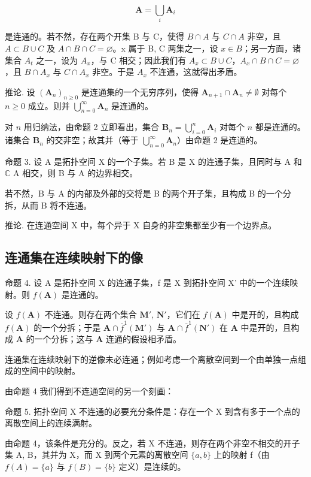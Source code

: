 \[
\mathbf {A} = \bigcup_ {i} \mathbf {A} _ {i}
\]

是连通的。若不然，存在两个开集 B 与 C，使得 \(B \cap A\) 与 \(C \cap A\) 非空，且 \(A \subset B \cup C\) 及 \(A \cap B \cap C = \varnothing\)。x 属于 B, C 两集之一，设 \(x \in B\)；另一方面，诸集合 \(A_t\) 之一，设为 \(A_x\)，与 C 相交；因此我们有 \(A_x \subset B \cup C\)，\(A_x \cap B \cap C = \varnothing\)，且 \(B \cap A_x\) 与 \(C \cap A_x\) 非空。于是 \(A_x\) 不连通，这就得出矛盾。

推论. 设 \((\mathbf{A}_n)_{n\geqslant 0}\) 是连通集的一个无穷序列，使得 \(\mathbf{A}_{n + 1}\cap \mathbf{A}_n\neq \emptyset\) 对每个 \(n\geqslant 0\) 成立。则并 \(\bigcup_{n = 0}^{\infty}\mathbf{A}_n\) 是连通的。

对 \(n\) 用归纳法，由命题 2 立即看出，集合 \(\mathbf{B}_n = \bigcup_{i=0}^n \mathbf{A}_i\) 对每个 \(n\) 都是连通的。诸集合 \(\mathbf{B}_n\) 的交非空；故其并（等于 \(\bigcup_{n=0}^{\infty} \mathbf{A}_n\)）由命题 2 是连通的。

命题 3. 设 A 是拓扑空间 X 的一个子集。若 B 是 X 的连通子集，且同时与 A 和 \(\mathbb{C}\) A 相交，则 B 与 A 的边界相交。

若不然，B 与 A 的内部及外部的交将是 B 的两个开子集，且构成 B 的一个分拆，从而 B 将不连通。

推论. 在连通空间 X 中，每个异于 X 自身的非空集都至少有一个边界点。

\subsection{连通集在连续映射下的像}

命题 4. 设 A 是拓扑空间 X 的连通子集，f 是 X 到拓扑空间 X' 中的一个连续映射。则 \(f(\mathbf{A})\) 是连通的。

设 \(f(\mathbf{A})\) 不连通。则存在两个集合 \(\mathbf{M}'\), \(\mathbf{N}'\)，它们在 \(f(\mathbf{A})\) 中是开的，且构成 \(f(\mathbf{A})\) 的一个分拆；于是 \(\mathbf{A} \cap \overline{f}^{1}(\mathbf{M}')\) 与 \(\mathbf{A} \cap \overline{f}^{1}(\mathbf{N}')\) 在 \(\mathbf{A}\) 中是开的，且构成 \(\mathbf{A}\) 的一个分拆；这与 \(\mathbf{A}\) 连通的假设相矛盾。

连通集在连续映射下的逆像未必连通；例如考虑一个离散空间到一个由单独一点组成的空间中的映射。

由命题 4 我们得到不连通空间的另一个刻画：

命题 5. 拓扑空间 X 不连通的必要充分条件是：存在一个 X 到含有多于一个点的离散空间上的连续满射。

由命题 4，该条件是充分的。反之，若 X 不连通，则存在两个非空不相交的开子集 A, B，其并为 X，而 X 到两个元素的离散空间 \(\{a, b\}\) 上的映射 f（由 \(f(A) = \{a\}\) 与 \(f(B) = \{b\}\) 定义）是连续的。

